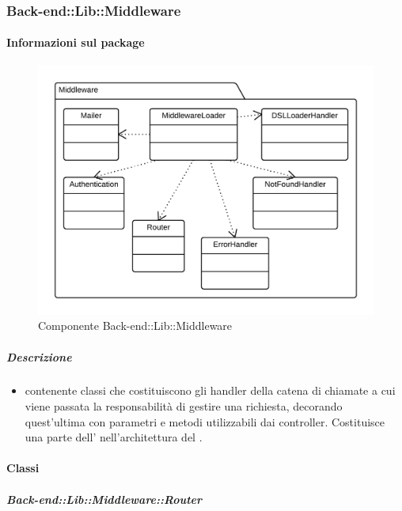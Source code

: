   \subsubsection{Back-end::Lib::Middleware}
  \paragraph{Informazioni sul package} 
    \begin{figure}[H] 
      \begin{center} 
        \includegraphics[width=\textwidth]{packages/Back-end::Lib::Middleware.png}  
        \caption{Componente Back-end::Lib::Middleware}
      \end{center}  
    \end{figure} 
  \subparagraph{Descrizione} 
    \begin{itemize}
    \item[]  contenente classi che costituiscono gli handler della catena di chiamate a cui viene passata la responsabilità di gestire una richiesta,  decorando quest'ultima con parametri e metodi utilizzabili dai controller. Costituisce una parte dell'  nell'architettura  del .
    \end{itemize} 
    \paragraph{Classi}
      \subparagraph{Back-end::Lib::Middleware::Router}
        

